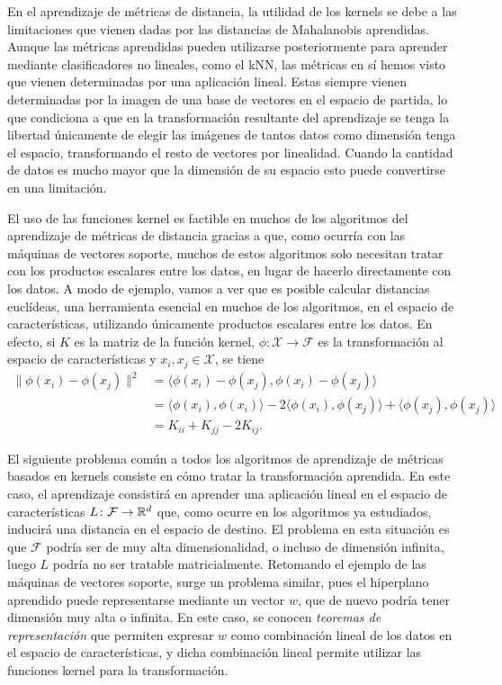 En el aprendizaje de métricas de distancia, la utilidad de los kernels se debe a las limitaciones que vienen dadas por las distancias de Mahalanobis aprendidas. Aunque las métricas aprendidas pueden utilizarse posteriormente para aprender mediante clasificadores no lineales, como el kNN, las métricas en sí hemos visto que vienen determinadas por una aplicación lineal. Estas siempre vienen determinadas por la imagen de una base de vectores en el espacio de partida, lo que condiciona a que en la transformación resultante del aprendizaje se tenga la libertad únicamente de elegir las imágenes de tantos datos como dimensión tenga el espacio, transformando el resto de vectores por linealidad. Cuando la cantidad de datos es mucho mayor que la dimensión de su espacio esto puede convertirse en una limitación.

El uso de las funciones kernel es factible en muchos de los algoritmos del aprendizaje de métricas de distancia gracias a que, como ocurría con las máquinas de vectores soporte, muchos de estos algoritmos solo necesitan tratar con los productos escalares entre los datos, en lugar de hacerlo directamente con los datos. A modo de ejemplo, vamos a ver que es posible calcular distancias euclídeas, una herramienta esencial en muchos de los algoritmos, en el espacio de características, utilizando únicamente productos escalares entre los datos. En efecto, si $K$ es la matriz de la función kernel, $\phi\colon \mathcal{X} \to \mathcal{F}$ es la transformación al espacio de características y $x_i,x_j \in \mathcal{X}$, se tiene
\begin{equation} \label{eq:dist_features}
    \begin{split}
    \|\phi(x_i)-\phi(x_j)\|^2 &= \langle \phi(x_i)-\phi(x_j), \phi(x_i) - \phi(x_j) \rangle \\
                              &= \langle \phi(x_i),\phi(x_i) \rangle - 2 \langle\phi(x_i), \phi(x_j) \rangle + \langle \phi(x_j), \phi(x_j) \rangle \\
                              &= K_{ii} + K_{jj} -2K_{ij}.
    \end{split}
\end{equation}

El siguiente problema común a todos los algoritmos de aprendizaje de métricas basados en kernels consiste en cómo tratar la transformación aprendida. En este caso, el aprendizaje consistirá en aprender una aplicación lineal en el espacio de características $L \colon \mathcal{F} \to \mathbb{R}^d$ que, como ocurre en los algoritmos ya estudiados, inducirá una distancia en el espacio de destino. El problema en esta situación es que $\mathcal{F}$ podría ser de muy alta dimensionalidad, o incluso de dimensión infinita, luego $L$ podría no ser tratable matricialmente. Retomando el ejemplo de las máquinas de vectores soporte, surge un problema similar, pues el hiperplano aprendido puede representarse mediante un vector $w$, que de nuevo podría tener dimensión muy alta o infinita. En este caso, se conocen \emph{teoremas de representación} que permiten expresar $w$ como combinación lineal de los datos en el espacio de características, y dicha combinación lineal permite utilizar las funciones kernel para la transformación.

